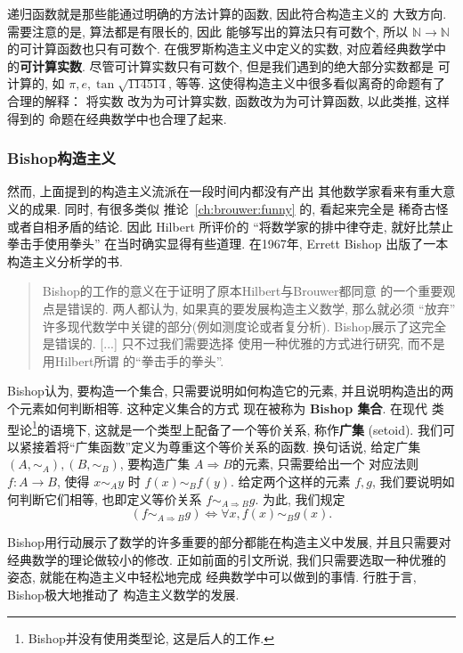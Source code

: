 \documentclass[UTF8]{ctexbook}
\theoremstyle{plain}
\theoremstyle{definition}
\theoremstyle{remark}
\begin{document}
递归函数就是那些能通过明确的方法计算的函数, 因此符合构造主义的
大致方向. 需要注意的是, 算法都是有限长的, 因此
能够写出的算法只有可数个, 所以 \(\mathbb N \to \mathbb N\)
的可计算函数也只有可数个.
在俄罗斯构造主义中定义的实数, 对应着经典数学中的\textbf{可计算实数}.
尽管可计算实数只有可数个, 但是我们遇到的绝大部分实数都是
可计算的, 如 \(\pi, e, \tan\sqrt{114514}\), 等等.
这使得构造主义中很多看似离奇的命题有了合理的解释： 将实数
改为为可计算实数, 函数改为为可计算函数, 以此类推, 这样得到的
命题在经典数学中也合理了起来.

\subsubsection{Bishop构造主义}\label{ch:bishop}

然而, 上面提到的构造主义流派在一段时间内都没有产出
其他数学家看来有重大意义的成果. 同时, 有很多类似
推论~\ref{ch:brouwer:funny} 的, 看起来完全是
稀奇古怪或者自相矛盾的结论.
因此 Hilbert 所评价的 “将数学家的排中律夺走,
就好比禁止拳击手使用拳头” 在当时确实显得有些道理.
在1967年, Errett Bishop 出版了一本构造主义分析学的书.
\begin{quotation}
Bishop的工作的意义在于证明了原本Hilbert与Brouwer都同意
的一个重要观点是错误的. 两人都认为, 如果真的要发展构造主义数学,
那么就必须 “放弃” 许多现代数学中关键的部分(例如测度论或者复分析).
Bishop展示了这完全是错误的. [...] 只不过我们需要选择
使用一种优雅的方式进行研究, 而不是用Hilbert所谓
的“拳击手的拳头”.~\cite{beeson:1985:constructive}
\end{quotation}

Bishop认为, 要构造一个集合, 只需要说明如何构造它的元素,
并且说明构造出的两个元素如何判断相等. 这种定义集合的方式
现在被称为 \textbf{Bishop 集合}. 在现代
类型论\footnote{Bishop并没有使用类型论, 这是后人的工作.}的语境下,
这就是一个类型上配备了一个等价关系, 称作\textbf{广集} (setoid).
我们可以紧接着将“广集函数”定义为尊重这个等价关系的函数.
换句话说, 给定广集 \((A, \sim_A),(B, \sim_B)\),
要构造广集 \(A \Rightarrow B\)的元素, 只需要给出一个
对应法则 \(f : A \to B\), 使得 \(x \sim_A y\) 时
\(f(x) \sim_B f(y)\). 给定两个这样的元素 \(f,g\),
我们要说明如何判断它们相等, 也即定义等价关系
\(f \sim_{A\Rightarrow B} g\). 为此, 我们规定
\[(f \sim_{A\Rightarrow B} g) \iff \forall x, f(x) \sim_B g(x).\]

Bishop用行动展示了数学的许多重要的部分都能在构造主义中发展,
并且只需要对经典数学的理论做较小的修改. 正如前面的引文所说,
我们只需要选取一种优雅的姿态, 就能在构造主义中轻松地完成
经典数学中可以做到的事情. 行胜于言, Bishop极大地推动了
构造主义数学的发展.
\end{document}
